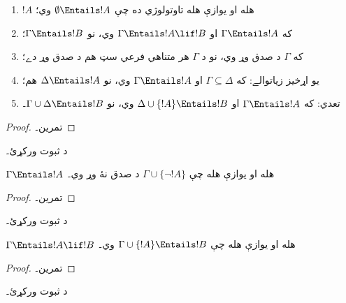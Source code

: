 \documentclass[../../../include/open-logic-section]{subfiles}
\begin{document}
\begin{prop}
\begin{enumerate} 
\item $!A$ هله او يوازې هله تاوتولوژي ده چې
  $\emptyset \Entails !A$ وي؛ 
\item که $\Gamma \Entails !A$ او $\Gamma \Entails !A \lif !B$ وي،
  نو $\Gamma \Entails !B$؛
\item که $\Gamma$ د صدق وړ وي، نو د $\Gamma$ هر متناهي فرعي سټ هم
  د صدق وړ دے؛ 
\item {} يو اړخيز زياتوالے: که
  $\Gamma \subseteq \Delta$ او $\Gamma \Entails !A$ وي، نو
  $\Delta \Entails !A$ هم؛
\item {} تعدي: که $\Gamma \Entails !A$ او
  $\Delta \cup \{ !A\} \Entails !B$ وي، نو
  $\Gamma \cup \Delta \Entails !B$۔
\end{enumerate}
\end{prop}

\begin{proof}
تمرين۔
\end{proof}

\begin{prob}
د  ثبوت ورکړئ۔
\end{prob}

\begin{prop}
  $\Gamma \Entails !A$ هله او يوازې هله چې
  $\Gamma \cup \{\lnot !A\}$ د صدق نۀ وړ وي۔
\end{prop}

\begin{proof}
تمرين۔
\end{proof}

\begin{prob}
د  ثبوت ورکړئ۔
\end{prob}

\begin{thm}
   $\Gamma \Entails !A \lif !B$ هله او
  يوازې هله چې $\Gamma \cup \{!A\} \Entails !B$ وي۔
\end{thm}

\begin{proof}
تمرين۔
\end{proof}

\begin{prob}
د  ثبوت ورکړئ۔
\end{prob}
\end{document}
